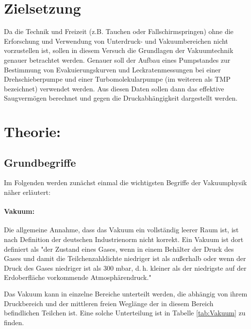 \section{Zielsetzung}
\label{sec:Zielsetzung}
Da die Technik und Freizeit (z.B. Tauchen oder Fallschirmspringen) ohne die Erforschung und Verwendung von Unterdruck- und Vakuumbereichen nicht vorzustellen
ist, sollen in diesem Versuch die Grundlagen der Vakuumtechnik genauer betrachtet werden.
Genauer soll der Aufbau eines Pumpstandes zur Bestimmung von Evakuierungskurven und Leckratenmessungen
bei einer Drehschieberpumpe und einer Turbomolekularpumpe (im weiteren als TMP bezeichnet) verwendet werden.
Aus diesen Daten sollen dann das effektive Saugvermögen berechnet und gegen die Druckabhängigkeit dargestellt werden.


\section{Theorie:}
\label{sec:Theorie}
\subsection{Grundbegriffe}

Im Folgenden werden zunächst einmal die wichtigsten Begriffe der Vakuumphysik näher erläutert:
\paragraph{Vakuum:}
Die allgemeine Annahme, dass das Vakuum ein vollständig leerer Raum ist, ist nach Definition der
deutschen Industrienorm nicht korrekt.
Ein Vakuum ist dort definiert als "der Zustand eines Gases, wenn in einem Behälter der
Druck des Gases und damit die Teilchenzahldichte niedriger ist als außerhalb oder wenn der Druck
des Gases niedriger ist als 300 mbar, d. h. kleiner als der niedrigste auf der Erdoberfläche
vorkommende Atmosphärendruck."\cite{vakuum}

Das Vakuum kann in einzelne Bereiche unterteilt werden, die abhängig von ihrem Druckbereich und der mittleren
freien Weglänge der in diesem Bereich befindlichen Teilchen ist.
Eine solche Unterteilung ist in Tabelle \ref{tab:Vakuum} zu finden.

